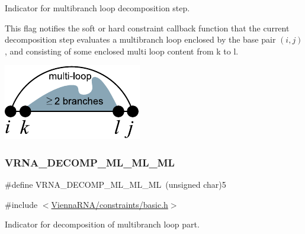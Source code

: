 Indicator for multibranch loop decomposition step. 

This flag notifies the soft or hard constraint callback function that the current decomposition step evaluates a multibranch loop enclosed by the base pair $(i,j)$, and consisting of some enclosed multi loop content from k to l.

 
\begin{DoxyImageNoCaption}
  \mbox{\includegraphics[width=\textwidth,height=\textheight/2,keepaspectratio=true]{decomp_ml}}
\end{DoxyImageNoCaption}
 \mbox{\label{group__constraints_ga735517266f2e35e1374b8f1ea77ef23e}} 
\subsubsection{\texorpdfstring{V\+R\+N\+A\+\_\+\+D\+E\+C\+O\+M\+P\+\_\+\+M\+L\+\_\+\+M\+L\+\_\+\+ML}{VRNA\_DECOMP\_ML\_ML\_ML}}
{\footnotesize\ttfamily \#define V\+R\+N\+A\+\_\+\+D\+E\+C\+O\+M\+P\+\_\+\+M\+L\+\_\+\+M\+L\+\_\+\+ML~(unsigned char)5}



{\ttfamily \#include $<$\hyperlink{constraints_2basic_8h}{Vienna\+R\+N\+A/constraints/basic.\+h}$>$}



Indicator for decomposition of multibranch loop part. 

